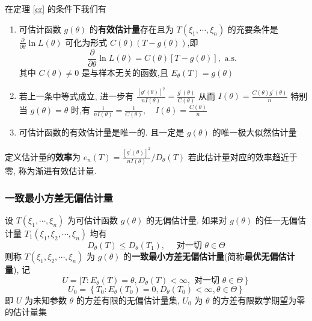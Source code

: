 \documentclass[10pt]{yerbaformat}
\begin{document}
\begin{proposition}
    在定理 \ref{cr} 的条件下我们有
    \begin{enumerate}
        \item 可估计函数 $g(\theta)$ 的\textbf{有效估计量}存在且为 $T\left(\xi_{1}, \cdots, \xi_{n}\right)$
              的充要条件是 $\frac{\partial}{\partial \theta} \ln L(\theta)$ 可化为形式 $C(\theta)(T-g(\theta))$,即 $$\frac{\partial}{\partial \theta} \ln L(\theta)=C(\theta)[T-g(\theta)], \text { a.s. }$$ 其中 $C(\theta) \neq 0$ 是与样本无关的函数,且 $E_{\theta}(T)=g(\theta)$
        \item 若上一条中等式成立, 进一步有 $\frac{\left[g'(\theta)\right]^{2}}{n I(\theta)}=\frac{g^{\prime}(\theta)}{C(\theta)}$ 从而 $I(\theta)=\frac{C(\theta) g^{\prime}(\theta)}{n}$ 特别当 $g(\theta)=\theta$ 时,有 $\frac{1}{n I(\theta)}=\frac{1}{C(\theta)}, \quad I(\theta)=\frac{C(\theta)}{n}$
        \item 可估计函数的有效估计量是唯一的. 且一定是 $g(\theta)$ 的唯一极大似然估计量
    \end{enumerate}
\end{proposition}

\begin{definition}
    定义估计量的\textbf{效率}为 $e_{n}(T)=\frac{\left[g^{\prime}(\theta)\right]^{2}}{n I(\theta)} / D_{\theta}(T)$ 若此估计量对应的效率趋近于零, 称为渐进有效估计量.
\end{definition}

\subsubsection{一致最小方差无偏估计量}
\begin{definition}\label{nobias}
    设 $T\left(\xi_{1}, \cdots, \xi_{n}\right)$ 为可估计函数 $g(\theta)$ 的无偏估计量. 如果对 $g(\theta)$ 的任一无偏估计量 $T_{1}\left(\xi_{1}, \xi_{2}, \cdots, \xi_{n}\right)$ 均有
    $$
        D_{\theta}(T) \leqslant D_{\theta}\left(T_{1}\right), \quad \text { 对一切 } \theta \in \Theta
    $$
    则称 $T\left(\xi_{1}, \xi_{2}, \cdots, \xi_{n}\right)$ 为 $g(\theta)$ 的\textbf{一致最小方差无偏估计量}(简称\textbf{最优无偏估计量}), 记
    $$
        U=\mid T: E_{\theta}(T)=\theta, D_{\theta}(T)<\infty, \text { 对一切 } \left.\theta \in \Theta\right\}
    $$
    $$U_{0}=\left\{T_{0}: E_{\theta}\left(T_{0}\right)=0, D_{\theta}\left(T_{0}\right)<\infty,\right. \left.\theta \in \Theta\right\}$$ 即 $U$ 为未知参数 $\theta$ 的方差有限的无偏估计量集, $U_{0}$ 为 $\theta$ 的方差有限数学期望为零的估计量集
\end{definition}
\end{document}

